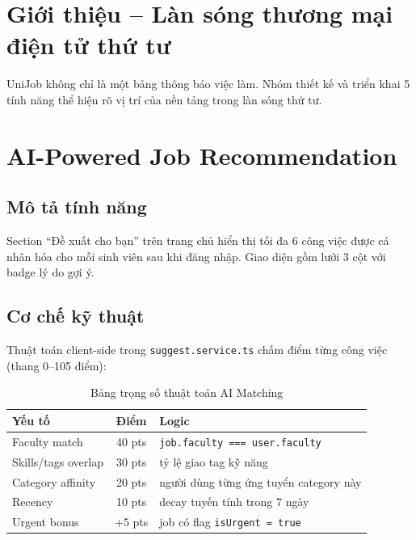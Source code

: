 
\section*{Giới thiệu -- Làn sóng thương mại điện tử thứ tư}

UniJob không chỉ là một bảng thông báo việc làm. Nhóm thiết kế và triển khai 5 tính năng
thể hiện rõ vị trí của nền tảng trong làn sóng thứ tư.

\section{AI-Powered Job Recommendation}

\subsection*{Mô tả tính năng}

Section ``Đề xuất cho bạn'' trên trang chủ hiển thị tối đa 6 công việc được cá nhân hóa
cho mỗi sinh viên sau khi đăng nhập. Giao diện gồm lưới 3 cột với badge lý do gợi ý.

\subsection*{Cơ chế kỹ thuật}

Thuật toán client-side trong \texttt{suggest.service.ts} chấm điểm từng công việc
(thang 0--105 điểm):

\begin{table}[H]
\centering
\caption{Bảng trọng số thuật toán AI Matching}
\begin{tabularx}{\textwidth}{|p{4cm}|c|X|}
\hline
\textbf{Yếu tố} & \textbf{Điểm} & \textbf{Logic} \\
\hline
Faculty match    & 40 pts & \texttt{job.faculty === user.faculty} \\
\hline
Skills/tags overlap & 30 pts & tỷ lệ giao tag kỹ năng \\
\hline
Category affinity & 20 pts & người dùng từng ứng tuyển category này \\
\hline
Recency          & 10 pts & decay tuyến tính trong 7 ngày \\
\hline
Urgent bonus     & +5 pts & job có flag \texttt{isUrgent = true} \\
\hline
\end{tabularx}
\end{table}

